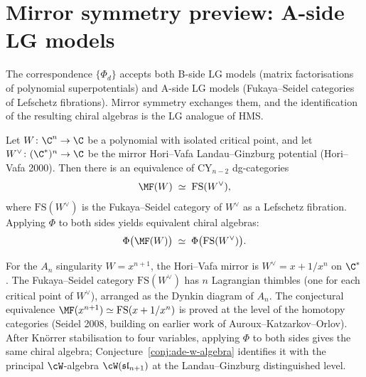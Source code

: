 \section{Mirror symmetry preview: A-side LG models}
\label{sec:mirror-lg-preview}

The correspondence $\{\Phi_d\}$ accepts both B-side LG models (matrix factorisations of polynomial superpotentials) and A-side LG models (Fukaya--Seidel categories of Lefschetz fibrations). Mirror symmetry exchanges them, and the identification of the resulting chiral algebras is the LG analogue of HMS.

\begin{conjecture}
\label{conj:lg-hms}
\ClaimStatusConjectured
Let $W \colon \C^n \to \C$ be a polynomial with isolated critical point, and let $W^\vee \colon (\C^*)^n \to \C$ be the mirror Hori--Vafa Landau--Ginzburg potential (Hori--Vafa 2000). Then there is an equivalence of CY$_{n-2}$ dg-categories
\[
 \MF(W) \;\simeq\; \mathrm{FS}(W^\vee),
\]
where $\mathrm{FS}(W^\vee)$ is the Fukaya--Seidel category of $W^\vee$ as a Lefschetz fibration. Applying $\Phi$ to both sides yields equivalent chiral algebras:
\[
 \Phi\bigl(\MF(W)\bigr) \;\simeq\; \Phi\bigl(\mathrm{FS}(W^\vee)\bigr).
\]
\end{conjecture}

\begin{example}
\label{ex:an-lefschetz-mirror}
For the $A_n$ singularity $W = x^{n+1}$, the Hori--Vafa mirror is $W^\vee = x + 1/x^n$ on $\C^*$. The Fukaya--Seidel category $\mathrm{FS}(W^\vee)$ has $n$ Lagrangian thimbles (one for each critical point of $W^\vee$), arranged as the Dynkin diagram of $A_n$. The conjectural equivalence $\MF(x^{n+1}) \simeq \mathrm{FS}(x + 1/x^n)$ is proved at the level of the homotopy categories (Seidel 2008, building on earlier work of Auroux--Katzarkov--Orlov). After Kn\"orrer stabilisation to four variables, applying $\Phi$ to both sides gives the same chiral algebra; Conjecture~\ref{conj:ade-w-algebra} identifies it with the principal $\cW$-algebra $\cW(\mathfrak{sl}_{n+1})$ at the Landau--Ginzburg distinguished level.
\end{example}

